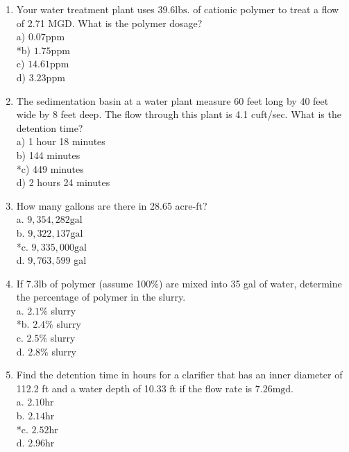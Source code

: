 \begin{enumerate}
  \item Your water treatment plant uses $39.6 \mathrm{lbs}$. of cationic polymer to treat a flow of 2.71 MGD. What is the polymer dosage?\\
a) $0.07 \mathrm{ppm}$\\
*b) $1.75 \mathrm{ppm}$\\
c) $14.61 \mathrm{ppm}$\\
d) $3.23 \mathrm{ppm}$\\

  \item The sedimentation basin at a water plant measure 60 feet long by 40 feet wide by 8 feet deep. The flow through this plant is 4.1 cuft/sec. What is the detention time?\\
a) 1 hour 18 minutes\\
b) 144 minutes\\
*c) 449 minutes\\
d) 2 hours 24 minutes\\

  \item How many gallons are there in 28.65 acre-ft?\\
a. $9,354,282 \mathrm{gal}$\\
b. $9,322,137 \mathrm{gal}$\\
*c. $9,335,000 \mathrm{gal}$\\
d. $9,763,599$ gal\\

  \item If $7.3 \mathrm{lb}$ of polymer (assume 100\%) are mixed into 35 gal of water, determine the percentage of polymer in the slurry.\\
a. $2.1 \%$ slurry\\
*b. $2.4 \%$ slurry\\
c. $2.5 \%$ slurry\\
d. $2.8 \%$ slurry\\

  \item Find the detention time in hours for a clarifier that has an inner diameter of 112.2 ft and a water depth of 10.33 ft if the flow rate is $7.26 \mathrm{mgd}$.\\
a. $2.10 \mathrm{hr}$\\
b. $2.14 \mathrm{hr}$\\
*c. $2.52 \mathrm{hr}$\\
d. $2.96 \mathrm{hr}$ \\
\end{enumerate}
